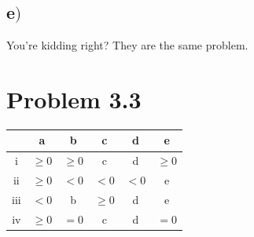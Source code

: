 \documentclass[a4paper,12pt]{article}
\begin{document}
\subsection*{e\()\)}
You're kidding right? They are the same problem.
\section*{Problem 3.3}
  \begin{center}
    \begin{tabular}{| c | c | c | c | c | c |}
      \hline
      & a & b & c & d & e \\ \hline
      i & \( \ge 0 \) & \( \ge 0 \) & c & d & \( \ge 0 \) \\ \hline
      ii & \( \ge 0 \) & \( < 0\) & \(< 0\) & \(< 0\) & e  \\ \hline
      iii & \( < 0\) & b & \(\ge 0\) & d & e \\ \hline
      iv & \(\ge 0\) & \(=0\) & c & d & \(=0\)\\
      \hline
    \end{tabular}
  \end{center}
\end{document}
